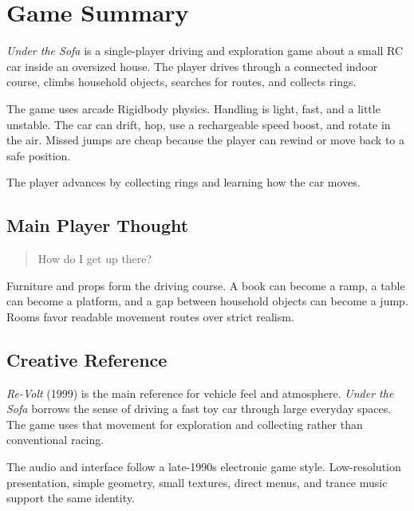 \documentclass[11pt,a4paper]{article}
\begin{document}
\hypersetup{pageanchor=true}
\tableofcontents
\clearpage
{}


\section{Game Summary}\label{game-summary}

\emph{Under the Sofa} is a single-player driving and exploration game about a small RC car inside an oversized house. The player drives through a connected indoor course, climbs household objects, searches for routes, and collects rings.

The game uses arcade Rigidbody physics. Handling is light, fast, and a little unstable. The car can drift, hop, use a rechargeable speed boost, and rotate in the air. Missed jumps are cheap because the player can rewind or move back to a safe position.

The player advances by collecting rings and learning how the car moves.

\subsection{Main Player Thought}\label{main-player-thought}

\begin{quote}
How do I get up there?
\end{quote}

Furniture and props form the driving course. A book can become a ramp, a table can become a platform, and a gap between household objects can become a jump. Rooms favor readable movement routes over strict realism.

\subsection{Creative Reference}\label{creative-reference}

\emph{Re-Volt} (1999) is the main reference for vehicle feel and atmosphere. \emph{Under the Sofa} borrows the sense of driving a fast toy car through large everyday spaces. The game uses that movement for exploration and collecting rather than conventional racing.

The audio and interface follow a late-1990s electronic game style. Low-resolution presentation, simple geometry, small textures, direct menus, and trance music support the same identity.
\end{document}

